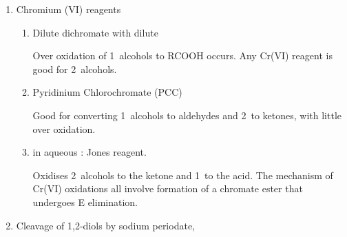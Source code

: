 \begin{enumerate}[label=\alph*)]

  \item Chromium (VI) reagents

    \begin{enumerate}[label=\roman*)]

      \item Dilute dichromate with dilute 


        Over oxidation of 1\de\ alcohols to RCOOH occurs. Any Cr(VI) reagent
        is good for 2\de\ alcohols.

      \item Pyridinium Chlorochromate (PCC)

        Good for converting 1\de\ alcohols to aldehydes and 2\de\ to ketones,
        with little over oxidation.


      \item {} in aqueous : Jones reagent.

        Oxidises 2\de\ alcohols to the ketone and 1\de\ to the acid. The
        mechanism of Cr(VI) oxidations all involve formation of a
        chromate ester that undergoes E elimination.


    \end{enumerate}

  \item Cleavage of 1,2-diols by sodium periodate, 

\end{enumerate}
